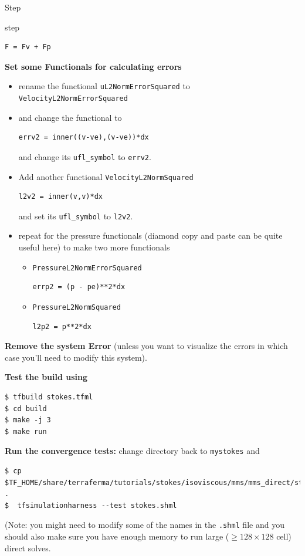 \begin{steps}{Step}
\begin{steps}{step}
\begin{lstlisting}[style=UFL]
F = Fv + Fp
    \end{lstlisting}
  \item\textbf{ Set some Functionals for calculating errors}
 \begin{itemize}
 \item rename the functional \texttt{uL2NormErrorSquared} to \texttt{VelocityL2NormErrorSquared} 
    \item and change  the functional to
      \begin{lstlisting}[style=Ufl]
        errv2 = inner((v-ve),(v-ve))*dx
      \end{lstlisting}
      and change its \texttt{ufl\_symbol} to \texttt{errv2}.
    \item Add another functional \texttt{VelocityL2NormSquared}
      \begin{lstlisting}[style=Ufl]
        l2v2 = inner(v,v)*dx
      \end{lstlisting}
      and set its \texttt{ufl\_symbol} to \texttt{l2v2}.
    \item repeat for the pressure functionals (diamond copy and paste can be
      quite useful here) to make two more functionals
      \begin{itemize}
      \item \texttt{PressureL2NormErrorSquared}
        \begin{lstlisting}[style=Ufl]
        errp2 = (p - pe)**2*dx
      \end{lstlisting}
    \item \texttt{PressureL2NormSquared}
        \begin{lstlisting}[style=Ufl]
        l2p2 = p**2*dx
      \end{lstlisting}
      \end{itemize}

    \end{itemize}


   \end{steps}
 \item \textbf{Remove the system Error} (unless you want to visualize
   the errors in which case you'll need to modify this system).
 \item \textbf{Test the build using}
   \begin{lstlisting}[style=Bash]
$ tfbuild stokes.tfml
$ cd build
$ make -j 3
$ make run
   \end{lstlisting}
 \item \textbf{Run the convergence tests:} change directory back to
   \texttt{mystokes} and
   \begin{lstlisting}[style=Bash]
$ cp $TF_HOME/share/terraferma/tutorials/stokes/isoviscous/mms/mms_direct/stokes.shml .
$  tfsimulationharness --test stokes.shml
\end{lstlisting} %
(Note: you might need to modify some of the names in the
\texttt{.shml} file and you should also make sure you have enough
memory to run large ($\geq 128\times128$ cell) direct solves. 
\end{steps}


